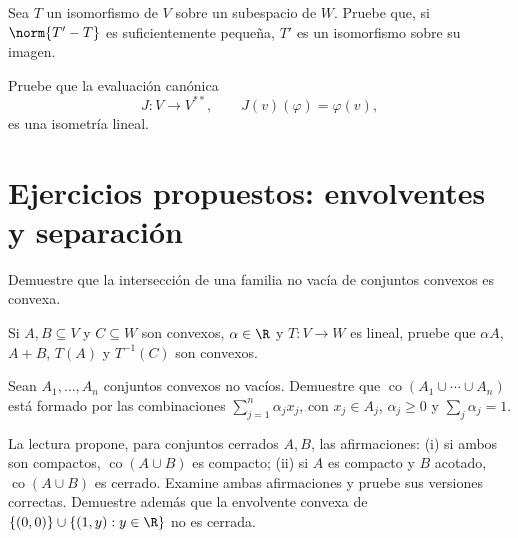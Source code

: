 \begin{ejercicio}\label{ej:lectura-21-7}
Sea $T$ un isomorfismo de $V$ sobre un subespacio de $W$. Pruebe que, si $\norm{T'-T}$ es suficientemente pequeña, $T'$ es un isomorfismo sobre su imagen.
\end{ejercicio}


\begin{ejercicio}\label{ej:lectura-21-8}
Pruebe que la evaluación canónica
\[
 J:V\longrightarrow V^{**},\qquad J(v)(\varphi)=\varphi(v),
\]
es una isometría lineal.
\end{ejercicio}


\section{Ejercicios propuestos: envolventes y separación}

\begin{ejercicio}\label{ej:lectura-24-1}
Demuestre que la intersección de una familia no vacía de conjuntos convexos es convexa.
\end{ejercicio}


\begin{ejercicio}\label{ej:lectura-24-2}
Si $A,B\subseteq V$ y $C\subseteq W$ son convexos, $\alpha\in\R$ y $T:V\to W$ es lineal, pruebe que $\alpha A$, $A+B$, $T(A)$ y $T^{-1}(C)$ son convexos.
\end{ejercicio}


\begin{ejercicio}\label{ej:lectura-24-3}
Sean $A_1,\ldots,A_n$ conjuntos convexos no vacíos. Demuestre que $\operatorname{co}(A_1\cup\cdots\cup A_n)$ está formado por las combinaciones $\sum_{j=1}^n\alpha_jx_j$, con $x_j\in A_j$, $\alpha_j\geq0$ y $\sum_j\alpha_j=1$.
\end{ejercicio}


\begin{ejercicio}\label{ej:lectura-24-4}
La lectura propone, para conjuntos cerrados $A,B$, las afirmaciones: (i) si ambos son compactos, $\operatorname{co}(A\cup B)$ es compacto; (ii) si $A$ es compacto y $B$ acotado, $\operatorname{co}(A\cup B)$ es cerrado. Examine ambas afirmaciones y pruebe sus versiones correctas. Demuestre además que la envolvente convexa de $\{(0,0)\}\cup\{(1,y):y\in\R\}$ no es cerrada.
\end{ejercicio}


